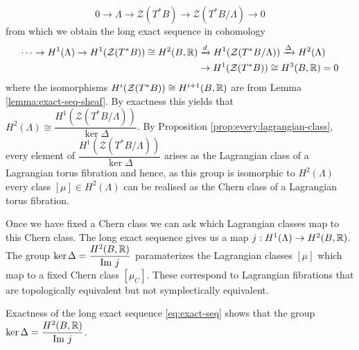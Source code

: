 $$0 \to \Lambda \to \mathcal{Z}(T^*B) \to \mathcal{Z}(T^*B/\Lambda) \to 0 $$
from which we obtain the long exact sequence in cohomology
\begin{align}\label{eq:exact-seq}
    \dots \to H^1(\Lambda) \to H^1(\mathcal{Z}(T^*B)) \cong H^2(B, \mathbb{R}) & \xrightarrow{d} H^1(\mathcal{Z}(T^*B/\Lambda)) \xrightarrow{\Delta} H^2(\Lambda) \\
                                                                       & \to H^1(\mathcal{Z}(T^*B)) \cong H^3(B, \mathbb{R})=0 \notag
\end{align}
where the isomorphisms $H^i(\mathcal{Z}(T^*B)) \cong H^{i+1}(B, \mathbb{R})$ are from Lemma \ref{lemma:exact-seq-sheaf}. By exactness this yields that
$H^2(\Lambda) \cong \dfrac{H^1(\mathcal{Z}(T^*B/\Lambda))}{\ker \Delta}$. By Proposition \ref{prop:every:lagrangian-class}, every element of $\dfrac{H^1(\mathcal{Z}(T^*B/\Lambda))}{\ker \Delta}$ arises
as the Lagrangian class of a Lagrangian torus fibration and hence, as this group is isomorphic to $H^2(\Lambda)$ every class $[\mu] \in H^2(\Lambda)$ can be realised as the Chern class of a Lagrangian torus fibration.

\begin{remark}\label{prop:classifying-group}
    Once we have fixed a Chern class we can ask which Lagrangian classes map to this Chern class. The long exact sequence gives us a map $j: H^1(\Lambda) \to H^2(B,\mathbb{R})$.
    The group $\ker \Delta = \dfrac{H^2(B, \mathbb{R})}{\text{Im } j}$ paramaterizes the Lagrangian classes $[\mu]$ which map to a fixed Chern class
    $[\mu_C]$. These correspond to Lagrangian fibrations that are topologically equivalent but not symplectically equivalent.
\end{remark}

\begin{remark}
    Exactness of the long exact sequence \ref{eq:exact-seq} shows that the group $\ker \Delta = \dfrac{H^2(B, \mathbb{R})}{\text{Im } j}$.
\end{remark}

